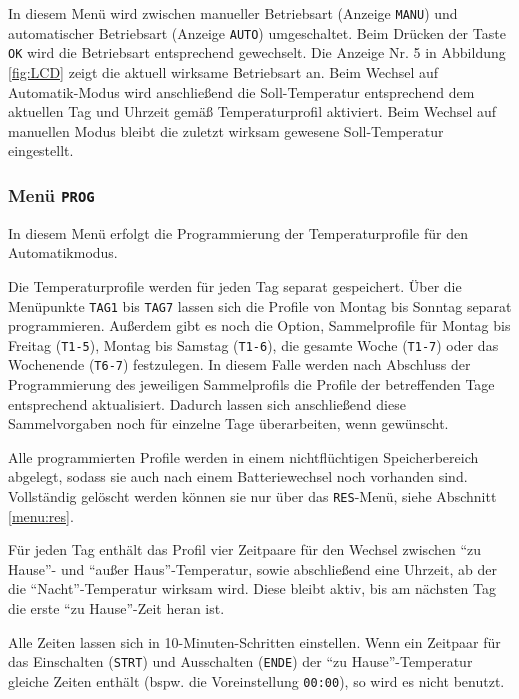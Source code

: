 \documentclass[a5paper,twoside]{article}
\begin{document}
In diesem Menü wird zwischen manueller Betriebsart (Anzeige
\texttt{MANU}) und automatischer Betriebsart (Anzeige \texttt{AUTO})
umgeschaltet.  Beim Drücken der Taste \texttt{OK} wird die Betriebsart
entsprechend gewechselt.  Die Anzeige Nr. 5 in Abbildung \ref{fig:LCD} zeigt die
aktuell wirksame Betriebsart an.  Beim Wechsel auf Automatik-Modus
wird anschließend die Soll-Temperatur entsprechend dem aktuellen Tag
und Uhrzeit gemäß Temperaturprofil aktiviert.  Beim Wechsel auf
manuellen Modus bleibt die zuletzt wirksam gewesene Soll-Temperatur
eingestellt.

\subsubsection {
  Menü \texttt{PROG}\label{menu:prog}
}

In diesem Menü erfolgt die Programmierung der Temperaturprofile für
den Automatikmodus.

Die Temperaturprofile werden für jeden Tag separat gespeichert.  Über
die Menüpunkte \texttt{TAG1} bis \texttt{TAG7} lassen sich die Profile
von Montag bis Sonntag separat programmieren.  Außerdem gibt es noch
die Option, Sammelprofile für Montag bis Freitag (\texttt{T1-5}),
Montag bis Samstag (\texttt{T1-6}), die gesamte Woche (\texttt{T1-7})
oder das Wochenende (\texttt{T6-7}) festzulegen.  In diesem Falle
werden nach Abschluss der Programmierung des jeweiligen Sammelprofils
die Profile der betreffenden Tage entsprechend aktualisiert.  Dadurch
lassen sich anschließend diese Sammelvorgaben noch für einzelne Tage
überarbeiten, wenn gewünscht.

Alle programmierten Profile werden in einem nichtflüchtigen
Speicherbereich abgelegt, sodass sie auch nach einem Batteriewechsel
noch vorhanden sind.  Vollständig gelöscht werden können sie nur über
das \texttt{RES}-Menü, siehe Abschnitt \ref{menu:res}.

Für jeden Tag enthält das Profil vier Zeitpaare für den Wechsel
zwischen "`zu Hause"'- und "`außer Haus"'-Temperatur, sowie
abschließend eine Uhrzeit, ab der die "`Nacht"'-Temperatur
wirksam wird.  Diese bleibt aktiv, bis am nächsten Tag die erste
"`zu Hause"'-Zeit heran ist.

Alle Zeiten lassen sich in 10-Minuten-Schritten einstellen.  Wenn ein
Zeitpaar für das Einschalten (\texttt{STRT}) und Ausschalten
(\texttt{ENDE}) der "`zu Hause"'-Temperatur gleiche Zeiten enthält
(bspw. die Voreinstellung \texttt{00:00}), so wird es nicht benutzt.
\end{document}
